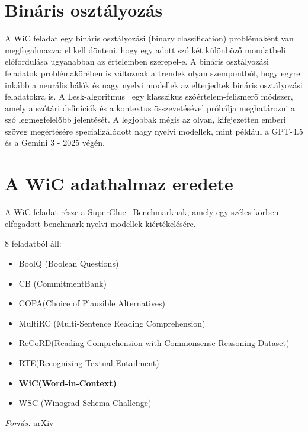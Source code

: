 \documentclass[12pt]{report}
\begin{document}
    \section{Bináris osztályozás}
    A WiC feladat egy bináris osztályozási (binary classification) problémaként van megfogalmazva: el kell dönteni, hogy egy adott szó két különböző mondatbeli előfordulása ugyanabban az értelemben szerepel-e.
    A bináris osztályozási feladatok problémakörében is változnak a trendek olyan szempontból, hogy egyre inkább a neurális hálók és nagy nyelvi modellek az elterjedtek bináris osztályozási feladatokra is.
    A Lesk-algoritmus~\cite{lesk1986automatic} egy klasszikus szóértelem-felismerő módszer, amely a szótári definíciók és a kontextus összevetésével próbálja meghatározni a szó legmegfelelőbb jelentését.
    A legjobbak mégis az olyan, kifejezetten emberi szöveg megértésére specializálódott nagy nyelvi modellek, mint például a GPT-4.5 és a Gemini 3 - 2025 végén.

    \label{wic:dataset}

    
    \section{A WiC adathalmaz eredete}
    A WiC feladat része a SuperGlue~\cite{sarlin2020superglue} Benchmarknak, amely egy széles körben elfogadott benchmark nyelvi modellek kiértékelésére.

    8 feladatból áll:


    \begin{itemize}
        \item  BoolQ (Boolean Questions)
        \item  CB (CommitmentBank)
        \item COPA(Choice of Plausible Alternatives)
        \item MultiRC (Multi-Sentence Reading Comprehension)
        \item ReCoRD(Reading Comprehension with Commonsense Reasoning Dataset)
        \item RTE(Recognizing Textual Entailment)
        \item \textbf{WiC(Word-in-Context)}
        \item  WSC (Winograd Schema Challenge)
    \end{itemize}
    \textit{ Forrás:} \href{https://arxiv.org/abs/1905.00537}{arXiv}~\cite{wang2020superglue}

    \vspace*{2cm}
\end{document}
